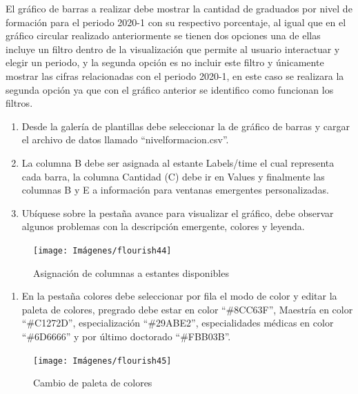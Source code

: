 \documentclass[
]{book}
\providecommand{\tightlist}{%
  \setlength{\itemsep}{0pt}\setlength{\parskip}{0pt}}
\begin{document}
El gráfico de barras a realizar debe mostrar la cantidad de graduados por nivel de formación para el periodo 2020-1 con su respectivo porcentaje, al igual que en el gráfico circular realizado anteriormente se tienen dos opciones una de ellas incluye un filtro dentro de la visualización que permite al usuario interactuar y elegir un periodo, y la segunda opción es no incluir este filtro y únicamente mostrar las cifras relacionadas con el periodo 2020-1, en este caso se realizara la segunda opción ya que con el gráfico anterior se identifico como funcionan los filtros.

\begin{enumerate}
\def\labelenumi{\arabic{enumi}.}
\item
  Desde la galería de plantillas debe seleccionar la de gráfico de barras y cargar el archivo de datos llamado ``nivelformacion.csv''.
\item
  La columna B debe ser asignada al estante Labels/time el cual representa cada barra, la columna Cantidad (C) debe ir en Values y finalmente las columnas B y E a información para ventanas emergentes personalizadas.
\item
  Ubíquese sobre la pestaña avance para visualizar el gráfico, debe observar algunos problemas con la descripción emergente, colores y leyenda.
\end{enumerate}

\begin{figure}

{\centering \texttt{[image: Imágenes/flourish44]} 

}

\caption{Asignación de columnas a estantes disponibles}\label{fig:paso3graficobarrasflourish-fig}
\end{figure}

\begin{enumerate}
\def\labelenumi{\arabic{enumi}.}
\setcounter{enumi}{3}
\tightlist
\item
  En la pestaña colores debe seleccionar por fila el modo de color y editar la paleta de colores, pregrado debe estar en color ``\#8CC63F'', Maestría en color ``\#C1272D'', especialización ``\#29ABE2'', especialidades médicas en color ``\#6D6666'' y por último doctorado ``\#FBB03B''.
\end{enumerate}

\begin{figure}

{\centering \texttt{[image: Imágenes/flourish45]} 

}

\caption{Cambio de paleta de colores}\label{fig:paso4graficobarrasflourish-fig}
\end{figure}
\end{document}

